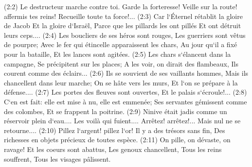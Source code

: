\verse (2:2) Le destructeur marche contre toi. Garde la forteresse! Veille sur la route! affermis tes reins! Recueille toute ta force!... 
\verse (2:3) Car l`Éternel rétablit la gloire de Jacob Et la gloire d`Israël, Parce que les pillards les ont pillés Et ont détruit leurs ceps.... 
\verse (2:4) Les boucliers de ses héros sont rouges, Les guerriers sont vêtus de pourpre; Avec le fer qui étincelle apparaissent les chars, Au jour qu`il a fixé pour la bataille, Et les lances sont agitées. 
\verse (2:5) Les chars s`élancent dans la campagne, Se précipitent sur les places; A les voir, on dirait des flambeaux, Ils courent comme des éclairs... 
\verse (2:6) Ils se souvient de ses vaillants hommes, Mais ils chancellent dans leur marche; On se hâte vers les murs, Et l`on se prépare à la défense.... 
\verse (2:7) Les portes des fleuves sont ouvertes, Et le palais s`écroule!... 
\verse (2:8) C`en est fait: elle est mise à nu, elle est emmenée; Ses servantes gémissent comme des colombes, Et se frappent la poitrine. 
\verse (2:9) Ninive était jadis comme un réservoir plein d`eau.... Les voilà qui fuient.... Arrêtez! arrêtez!... Mais nul ne se retourne.... 
\verse (2:10) Pillez l`argent! pillez l`or! Il y a des trésors sans fin, Des richesses en objets précieux de toutes espèce. 
\verse (2:11) On pille, on dévaste, on ravage! Et les coeurs sont abattus, Les genoux chancellent, Tous les reins souffrent, Tous les visages pâlissent. 
